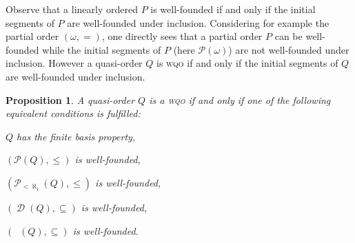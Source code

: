 \documentclass{article}%
\theoremstyle{plain}
\newtheorem{proposition}[theorem]{Proposition}
\theoremstyle{definition}
\theoremstyle{remark}
\newcommand{\wqo}{\textsc{wqo}}
\newcommand{\CtblSubs}{\mathcal{P}_{<\aleph_{1}}}
\DeclareMathOperator{\Down}{\mathcal{D}} %
\DeclareMathOperator{\DownFb}{\Down_{\text{fb}}} %
\begin{document}
Observe that a linearly ordered $P$ is well-founded if and only if the initial segments of $P$ are well-founded under inclusion. Considering for example the partial order $(\omega,=)$, one directly sees that a partial order $P$ can be well-founded while the initial segments of $P$ (here $\mathcal{P}(\omega)$) are not well-founded under inclusion. However a quasi-order $Q$ is \wqo{} if and only if the initial segments of $Q$ are well-founded under inclusion.



\begin{proposition}\label{prop:ClassicEquWqo2}
A quasi-order $Q$ is a \wqo{} if and only if one of the following equivalent conditions is fulfilled:
\begin{enumWqo}[Wqo]
\item \label{Item:4}$Q$ has the finite basis property,

\item \label{Item:5}$(\mathcal{P}(Q),\leq)$ is well-founded,

\item \label{Item:5b}$(\CtblSubs(Q),\leq)$ is well-founded,

\item \label{Item:6}$(\Down(Q),\subseteq)$ is well-founded,

\item \label{Item:6b} $(\DownFb(Q),\subseteq)$ is well-founded.
\end{enumWqo}
\end{proposition}
\end{document}
